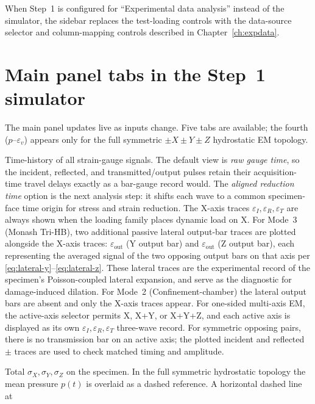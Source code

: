 \documentclass[11pt,a4paper,openany]{book}
\theoremstyle{handbook}
\newcommand{\sig}{\sigma}
\newcommand{\eps}{\varepsilon}
\begin{document}
When Step~1 is configured for ``Experimental data analysis'' instead of
the simulator, the sidebar replaces the test-loading controls with the
data-source selector and column-mapping controls described in
Chapter~\ref{ch:expdata}.

\section{Main panel tabs in the Step~1 simulator}

The main panel updates live as inputs change. Five tabs are available; the
fourth ($p$--$\eps_v$) appears only for the full symmetric
$\pm X\pm Y\pm Z$ hydrostatic EM topology.

\begin{description}[leftmargin=2em,style=nextline]
  \item[Bar waveforms] Time-history of all strain-gauge signals. The
    default view is \emph{raw gauge time}, so the incident, reflected, and
    transmitted/output pulses retain their acquisition-time travel delays
    exactly as a bar-gauge record would. The \emph{aligned reduction time}
    option is the next analysis step: it shifts each wave to a common
    specimen-face time origin for stress and strain reduction. The X-axis
    traces $\eps_I,\eps_R,\eps_T$ are always shown when the loading family
    places dynamic load on X. For Mode~3 (Monash Tri-HB),
    two additional passive lateral output-bar traces are plotted
    alongside the X-axis traces: $\eps_{\text{out}}$ (Y output bar) and
    $\eps_{\text{out}}$ (Z output bar), each representing the averaged
    signal of the two opposing output bars on that axis per
    \eqref{eq:lateral-y}--\eqref{eq:lateral-z}. These lateral traces are
    the experimental record of the specimen's Poisson-coupled lateral
    expansion, and serve as the diagnostic for damage-induced dilation.
    For Mode~2 (Confinement-chamber) the lateral output bars are absent
    and only the X-axis traces appear. For one-sided multi-axis EM, the
    active-axis selector permits X, X+Y, or X+Y+Z, and each active axis is
    displayed as its own $\eps_I,\eps_R,\eps_T$ three-wave record. For
    symmetric opposing pairs, there is no transmission bar on an active
    axis; the plotted incident and reflected $\pm$ traces are used to check
    matched timing and amplitude.
  \item[Specimen stresses] Total $\sig_X,\sig_Y,\sig_Z$ on the specimen.
    In the full symmetric hydrostatic topology the mean pressure $p(t)$ is
    overlaid as a dashed reference. A horizontal dashed line at

\end{description}
\end{document}
